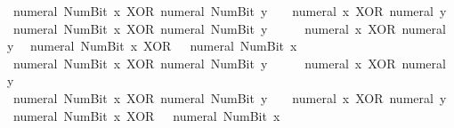 \begin{isabellebody}
\ \ {\isacartoucheopen}numeral\ {\isacharparenleft}{\kern0pt}Num{\isachardot}{\kern0pt}Bit{}\ x{\isacharparenright}{\kern0pt}\ XOR\ numeral\ {\isacharparenleft}{\kern0pt}Num{\isachardot}{\kern0pt}Bit{}\ y{\isacharparenright}{\kern0pt}\ {\isacharequal}{\kern0pt}\ {}\ {\isacharasterisk}{\kern0pt}\ {\isacharparenleft}{\kern0pt}numeral\ x\ XOR\ numeral\ y{\isacharparenright}{\kern0pt}{\isacartoucheclose}\isanewline
\ \ {\isacartoucheopen}numeral\ {\isacharparenleft}{\kern0pt}Num{\isachardot}{\kern0pt}Bit{}\ x{\isacharparenright}{\kern0pt}\ XOR\ numeral\ {\isacharparenleft}{\kern0pt}Num{\isachardot}{\kern0pt}Bit{}\ y{\isacharparenright}{\kern0pt}\ {\isacharequal}{\kern0pt}\ {}\ {\isacharplus}{\kern0pt}\ {}\ {\isacharasterisk}{\kern0pt}\ {\isacharparenleft}{\kern0pt}numeral\ x\ XOR\ numeral\ y{\isacharparenright}{\kern0pt}{\isacartoucheclose}\isanewline
\ \ {\isacartoucheopen}numeral\ {\isacharparenleft}{\kern0pt}Num{\isachardot}{\kern0pt}Bit{}\ x{\isacharparenright}{\kern0pt}\ XOR\ {}\ {\isacharequal}{\kern0pt}\ numeral\ {\isacharparenleft}{\kern0pt}Num{\isachardot}{\kern0pt}Bit{}\ x{\isacharparenright}{\kern0pt}{\isacartoucheclose}\isanewline
\ \ {\isacartoucheopen}numeral\ {\isacharparenleft}{\kern0pt}Num{\isachardot}{\kern0pt}Bit{}\ x{\isacharparenright}{\kern0pt}\ XOR\ numeral\ {\isacharparenleft}{\kern0pt}Num{\isachardot}{\kern0pt}Bit{}\ y{\isacharparenright}{\kern0pt}\ {\isacharequal}{\kern0pt}\ {}\ {\isacharplus}{\kern0pt}\ {}\ {\isacharasterisk}{\kern0pt}\ {\isacharparenleft}{\kern0pt}numeral\ x\ XOR\ numeral\ y{\isacharparenright}{\kern0pt}{\isacartoucheclose}\isanewline
\ \ {\isacartoucheopen}numeral\ {\isacharparenleft}{\kern0pt}Num{\isachardot}{\kern0pt}Bit{}\ x{\isacharparenright}{\kern0pt}\ XOR\ numeral\ {\isacharparenleft}{\kern0pt}Num{\isachardot}{\kern0pt}Bit{}\ y{\isacharparenright}{\kern0pt}\ {\isacharequal}{\kern0pt}\ {}\ {\isacharasterisk}{\kern0pt}\ {\isacharparenleft}{\kern0pt}numeral\ x\ XOR\ numeral\ y{\isacharparenright}{\kern0pt}{\isacartoucheclose}\isanewline
\ \ {\isacartoucheopen}numeral\ {\isacharparenleft}{\kern0pt}Num{\isachardot}{\kern0pt}Bit{}\ x{\isacharparenright}{\kern0pt}\ XOR\ {}\ {\isacharequal}{\kern0pt}\ numeral\ {\isacharparenleft}{\kern0pt}Num{\isachardot}{\kern0pt}Bit{}\ x{\isacharparenright}{\kern0pt}{\isacartoucheclose}\isanewline
%
\isadelimproof
\ \ %
\endisadelimproof
%
\isatagproof

\end{isabellebody}
